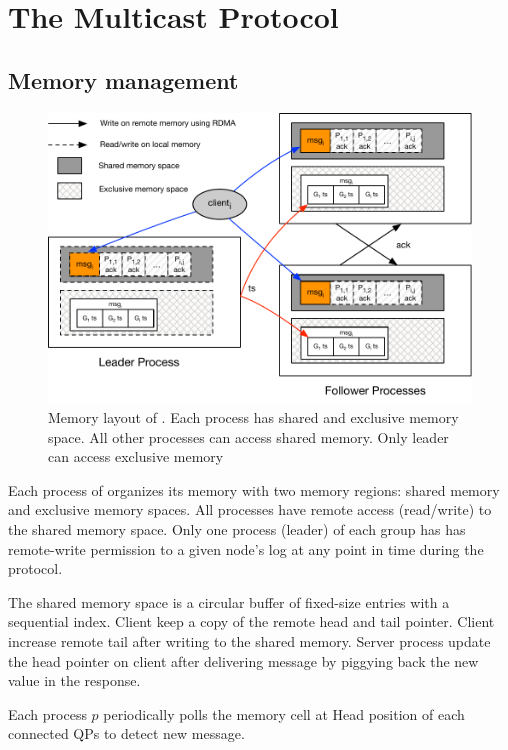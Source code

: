\section{The Multicast Protocol}

\subsection{Memory management}

\begin{figure}[ht!]
  \centering
  \includegraphics[width=1\linewidth]{figures/memory}
  \caption{Memory layout of \proto. Each process has shared and exclusive memory
  space. All other processes can access shared memory. Only leader can access
  exclusive memory }
  \label{fig:normal_operation_time}
\end{figure}

Each process of \proto organizes its memory with two memory regions: shared
memory and exclusive memory spaces. All processes have remote access
(read/write) to the shared memory space. Only one process (leader) of each group
has has remote-write permission to a given node’s log at any point in time
during the protocol.

The shared memory space is a circular buffer of fixed-size entries with a
sequential index. Client keep a copy of the remote head and tail pointer. Client
increase remote tail after writing to the shared memory. Server process update
the head pointer on client after delivering message by piggying back the new
value in the response.

Each process $p$ periodically polls the memory cell at Head position of each
connected QPs to detect new message.

